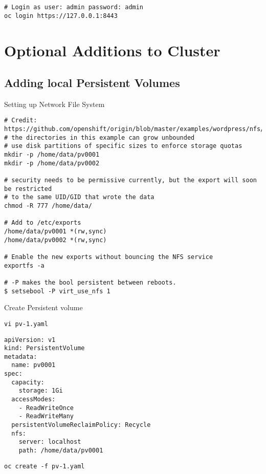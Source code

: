 \documentclass{article}
\begin{document}
 
\begin{lstlisting}[style=shell]
# Login as user: admin password: admin
oc login https://127.0.0.1:8443
\end{lstlisting}


\section{Optional Additions to Cluster}

\subsection{Adding local Persistent Volumes}

Setting up Network File System
\begin{lstlisting}
# Credit: https://github.com/openshift/origin/blob/master/examples/wordpress/nfs/README.md
# the directories in this example can grow unbounded
# use disk partitions of specific sizes to enforce storage quotas
mkdir -p /home/data/pv0001
mkdir -p /home/data/pv0002

# security needs to be permissive currently, but the export will soon be restricted 
# to the same UID/GID that wrote the data
chmod -R 777 /home/data/

# Add to /etc/exports
/home/data/pv0001 *(rw,sync)
/home/data/pv0002 *(rw,sync)

# Enable the new exports without bouncing the NFS service
exportfs -a

# -P makes the bool persistent between reboots.
$ setsebool -P virt_use_nfs 1
\end{lstlisting}

Create Persistent volume
\begin{lstlisting}[style=shell]
vi pv-1.yaml
\end{lstlisting}

\begin{lstlisting}[style=shell]
apiVersion: v1
kind: PersistentVolume
metadata:
  name: pv0001
spec:
  capacity:
    storage: 1Gi
  accessModes:
    - ReadWriteOnce
    - ReadWriteMany
  persistentVolumeReclaimPolicy: Recycle
  nfs:
    server: localhost
    path: /home/data/pv0001
\end{lstlisting}

\begin{lstlisting}[style=shell]
oc create -f pv-1.yaml
\end{lstlisting}


%
%


\end{document}
